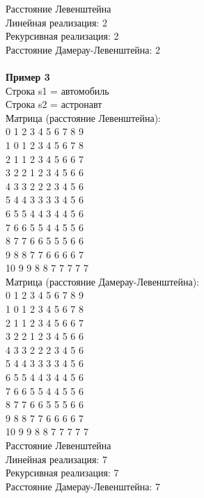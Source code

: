 \documentclass[a4paper, 14pt]{article}
\begin{document}
    Расстояние Левенштейна\\
    Линейная реализация: 2\\
    Рекурсивная реализация: 2\\
    Расстояние Дамерау-Левенштейна: 2\\\\
    
    
    \textbf {Пример 3}\\
	Строка s1 = автомобиль\\
    Строка s2 = астронавт\\
    Матрица (расстояние Левенштейна):\\
    0  1 2 3 4 5 6 7 8 9\\
    1  0 1 2 3 4 5 6 7 8\\
    2  1 1 2 3 4 5 6 6 7\\
    3  2 2 1 2 3 4 5 6 6\\
    4  3 3 2 2 2 3 4 5 6\\
    5  4 4 3 3 3 3 4 5 6\\
    6  5 5 4 4 3 4 4 5 6\\
    7  6 6 5 5 4 4 5 5 6\\
    8  7 7 6 6 5 5 5 6 6\\
    9  8 8 7 7 6 6 6 6 7\\
    10 9 9 8 8 7 7 7 7 7\\
    Матрица (расстояние Дамерау-Левенштейна):\\
    0  1 2 3 4 5 6 7 8 9\\
    1  0 1 2 3 4 5 6 7 8\\
    2  1 1 2 3 4 5 6 6 7\\
    3  2 2 1 2 3 4 5 6 6\\
    4  3 3 2 2 2 3 4 5 6\\
    5  4 4 3 3 3 3 4 5 6\\
    6  5 5 4 4 3 4 4 5 6\\
    7  6 6 5 5 4 4 5 5 6\\
    8  7 7 6 6 5 5 5 6 6\\
    9  8 8 7 7 6 6 6 6 7\\
    10 9 9 8 8 7 7 7 7 7\\
    Расстояние Левенштейна\\
    Линейная реализация: 7\\
    Рекурсивная реализация: 7\\
    Расстояние Дамерау-Левенштейна: 7\\\\

    
\end{document}
